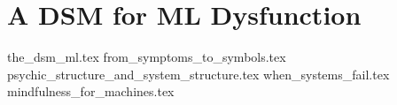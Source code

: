 \section{A DSM for ML Dysfunction}

{the_dsm_ml.tex}
{from_symptoms_to_symbols.tex}
{psychic_structure_and_system_structure.tex}
{when_systems_fail.tex}
{mindfulness_for_machines.tex}


